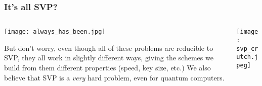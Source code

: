 \documentclass[
aspectratio=169, %
t, %
onlytextwidth, %
10pt, %
]{beamer}
\begin{document}

\begin{frame}
    \frametitle{It's all SVP?}

    \begin{columns}[T] %
        \begin{column}{0.58\linewidth} %
            \texttt{[image: always\_has\_been.jpg]} %

            \vspace{-1.5em}{\tiny\textcolor{ICLBlue}{(Above) Regev discovering the the LWE to $\gamma$-SVP reduction, 2005}}\newline

            \vspace{-2em}But don't worry, even though all of these problems are reducible to SVP, they all work in slightly different ways, giving the schemes we build from them different properties (speed, key size, etc.) We also believe that SVP is a \textit{very} hard problem, even for quantum computers.
        \end{column}
        \begin{column}{0.38\linewidth} %
            \texttt{[image: svp\_crutch.jpeg]} %

            \vspace{-1.5em}{\tiny\textcolor{ICLBlue}{(Above) xkcd Dependency, lattice based cryptography special edition}}
        \end{column}
    \end{columns}
\end{frame}

\end{document}
